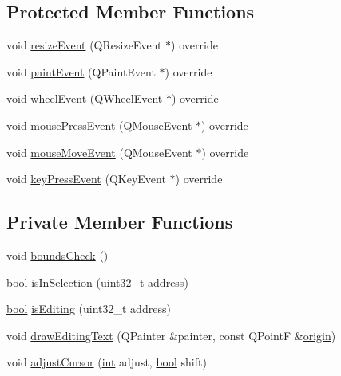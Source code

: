 \subsection*{Protected Member Functions}
\begin{DoxyCompactItemize}
\item 
void \mbox{\hyperlink{class_q_g_b_a_1_1_memory_model_aa4c1e00ada913a74ea17b1d81ebe6bd0}{resize\+Event}} (Q\+Resize\+Event $\ast$) override
\item 
void \mbox{\hyperlink{class_q_g_b_a_1_1_memory_model_a35ec506c640db58309a8e5857f25dae2}{paint\+Event}} (Q\+Paint\+Event $\ast$) override
\item 
void \mbox{\hyperlink{class_q_g_b_a_1_1_memory_model_aec8b8664b330d0b1aa19548620b0d2e4}{wheel\+Event}} (Q\+Wheel\+Event $\ast$) override
\item 
void \mbox{\hyperlink{class_q_g_b_a_1_1_memory_model_ab5958f08380d72823c9c0ce7e8a70937}{mouse\+Press\+Event}} (Q\+Mouse\+Event $\ast$) override
\item 
void \mbox{\hyperlink{class_q_g_b_a_1_1_memory_model_af01da9c37a2c3c20869ac0e7ed07addf}{mouse\+Move\+Event}} (Q\+Mouse\+Event $\ast$) override
\item 
void \mbox{\hyperlink{class_q_g_b_a_1_1_memory_model_a3a0ea3d2970136697f0b151e58521a2f}{key\+Press\+Event}} (Q\+Key\+Event $\ast$) override
\end{DoxyCompactItemize}
\subsection*{Private Member Functions}
\begin{DoxyCompactItemize}
\item 
void \mbox{\hyperlink{class_q_g_b_a_1_1_memory_model_a9a82532b4e9a1b4801f5fe1476c36c3a}{bounds\+Check}} ()
\item 
\mbox{\hyperlink{libretro_8h_a4a26dcae73fb7e1528214a068aca317e}{bool}} \mbox{\hyperlink{class_q_g_b_a_1_1_memory_model_a366e54f712353b0e3838decfd05e240c}{is\+In\+Selection}} (uint32\+\_\+t address)
\item 
\mbox{\hyperlink{libretro_8h_a4a26dcae73fb7e1528214a068aca317e}{bool}} \mbox{\hyperlink{class_q_g_b_a_1_1_memory_model_a6955aff7cf9ed1ef196aafdb0779707a}{is\+Editing}} (uint32\+\_\+t address)
\item 
void \mbox{\hyperlink{class_q_g_b_a_1_1_memory_model_a8366db270c3f803caa5f403f14bb5448}{draw\+Editing\+Text}} (Q\+Painter \&painter, const Q\+PointF \&\mbox{\hyperlink{ioapi_8h_a5f189a59b66f135978bce54f9d0fcade}{origin}})
\item 
void \mbox{\hyperlink{class_q_g_b_a_1_1_memory_model_a7a87523c5a952e03a4dfd1a501539577}{adjust\+Cursor}} (\mbox{\hyperlink{ioapi_8h_a787fa3cf048117ba7123753c1e74fcd6}{int}} adjust, \mbox{\hyperlink{libretro_8h_a4a26dcae73fb7e1528214a068aca317e}{bool}} shift)
\end{DoxyCompactItemize}
